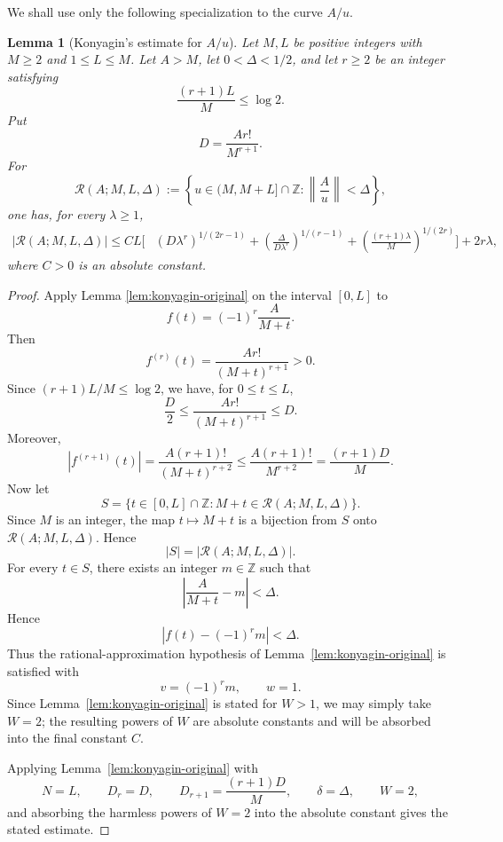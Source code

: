 \documentclass[11pt]{article}
\newtheorem{lemma}{Lemma}
\newcommand{\ZZ}{\mathbb Z}
\begin{document}
We shall use only the following specialization to the curve \(A/u\).

\begin{lemma}[Konyagin's estimate for \(A/u\)]
\label{lem:konyagin-special}
Let \(M,L\) be positive integers with \(M\ge2\) and \(1\le L\le M\).
Let \(A>M\), let \(0<\Delta<1/2\), and let \(r\ge2\) be an integer satisfying
\[
        \frac{(r+1)L}{M}\le \log 2 .
\]
Put
\[
        D=\frac{A r!}{M^{r+1}} .
\]
For
\[
        \mathcal R(A;M,L,\Delta)
        :=
        \left\{
        u\in(M,M+L]\cap\ZZ:
        \left\|\frac Au\right\|<\Delta
        \right\},
\]
one has, for every \(\lambda\ge1\),
\[
\begin{aligned}
        |\mathcal R(A;M,L,\Delta)|
        \le C L\bigg[&
        (D\lambda^r)^{1/(2r-1)}
        +
        \left(\frac{\Delta}{D\lambda^r}\right)^{1/(r-1)}
        +
        \left(\frac{(r+1)\lambda}{M}\right)^{1/(2r)}
        \bigg]
        +2r\lambda,
\end{aligned}
\]
where \(C>0\) is an absolute constant.
\end{lemma}

\begin{proof}
Apply Lemma \ref{lem:konyagin-original} on the interval \([0,L]\) to
\[
        f(t)=(-1)^r\frac{A}{M+t} .
\]
Then
\[
        f^{(r)}(t)=\frac{A r!}{(M+t)^{r+1}}>0 .
\]
Since \((r+1)L/M\le\log2\), we have, for \(0\le t\le L\),
\[
        \frac{D}{2}
        \le
        \frac{A r!}{(M+t)^{r+1}}
        \le
        D .
\]
Moreover,
\[
        |f^{(r+1)}(t)|
        =
        \frac{A(r+1)!}{(M+t)^{r+2}}
        \le
        \frac{A(r+1)!}{M^{r+2}}
        =
        \frac{(r+1)D}{M} .
\]
Now let
\[
        S=
        \{t\in[0,L]\cap\ZZ: M+t\in\mathcal R(A;M,L,\Delta)\}.
\]
Since \(M\) is an integer, the map \(t\mapsto M+t\) is a bijection from \(S\)
onto \(\mathcal R(A;M,L,\Delta)\). Hence
\[
        |S|=|\mathcal R(A;M,L,\Delta)|.
\]
For every \(t\in S\), there exists an integer \(m\in\ZZ\) such that
\[
    \left|\frac{A}{M+t}-m\right|<\Delta.
\]
Hence
\[
    |f(t)-(-1)^r m|<\Delta.
\]
Thus the rational-approximation hypothesis of
Lemma~\ref{lem:konyagin-original} is satisfied with
\[
    v=(-1)^r m,\qquad w=1.
\]
Since Lemma~\ref{lem:konyagin-original} is stated for \(W>1\), we may simply
take \(W=2\); the resulting powers of \(W\) are absolute constants and will be
absorbed into the final constant \(C\).

Applying Lemma~\ref{lem:konyagin-original} with
\[
    N=L,\qquad
    D_r=D,\qquad
    D_{r+1}=\frac{(r+1)D}{M},\qquad
    \delta=\Delta,\qquad
    W=2,
\]
and absorbing the harmless powers of \(W=2\) into the absolute constant gives
the stated estimate.
\end{proof}
\end{document}
